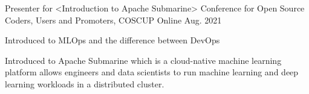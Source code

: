 

\begin{cventries}

  \cventry
    {Presenter for <Introduction to Apache Submarine>} %
    {Conference for Open Source Coders, Users and Promoters, COSCUP} %
    {Online} %
    {Aug. 2021} %
    {
      \begin{cvitems} %
        \item {Introduced to MLOps and the difference between DevOps}
        \item {Introduced to Apache Submarine which is a cloud-native machine learning platform allows engineers and data scientists to run machine learning and deep learning workloads in a distributed cluster.}
      \end{cvitems}
    }
\end{cventries}
